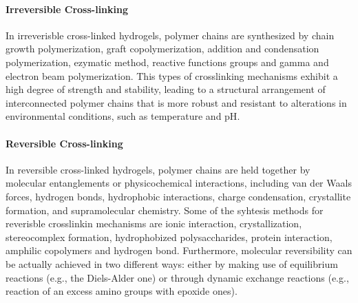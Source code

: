 \paragraph{Irreversible Cross-linking}
In irreverisble cross-linked hydrogels, polymer chains are synthesized by chain growth polymerization, graft copolymerization, addition and condensation polymerization, ezymatic method, reactive functions groups and gamma and electron beam polymerization\citep{maitraCrosslinkingHydrogelsReview2014,bustamantetorresHydrogelsClassificationAccording2021}.
This types of crosslinking mechanisms exhibit a high degree of strength and stability, leading to a structural arrangement of interconnected polymer chains that is more robust and resistant to alterations in environmental conditions, such as temperature and pH\citep{maitraCrosslinkingHydrogelsReview2014}.


\paragraph{Reversible Cross-linking}
In reversible cross-linked hydrogels, polymer chains are held together by molecular entanglements or physicochemical interactions, including van der Waals forces, hydrogen bonds, hydrophobic interactions, charge condensation, crystallite formation, and supramolecular chemistry\citep{bustamantetorresHydrogelsClassificationAccording2021,maitraCrosslinkingHydrogelsReview2014}.
Some of the syhtesis methods for reverisble crosslinkin mechanisms are ionic interaction, crystallization, stereocomplex formation, hydrophobized polysaccharides, protein interaction, amphilic copolymers and hydrogen bond\citep{maitraCrosslinkingHydrogelsReview2014,bustamantetorresHydrogelsClassificationAccording2021}.
Furthermore, molecular reversibility can be actually achieved in two different ways: either by making use of equilibrium reactions (e.g., the Diels-Alder one) or through dynamic exchange reactions (e.g., reaction of an excess amino groups with epoxide ones)\citep{picchioniHydrogelsBasedDynamic2018}. 

